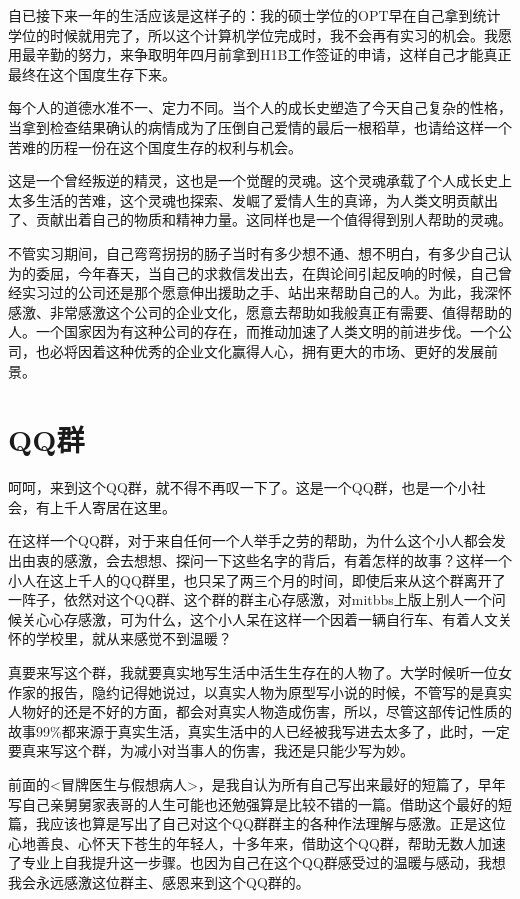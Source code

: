\documentclass[12pt]{book}
\begin{document}
自已接下来一年的生活应该是这样子的：我的硕士学位的OPT早在自己拿到统计学位的时候就用完了，所以这个计算机学位完成时，我不会再有实习的机会。我愿用最辛勤的努力，来争取明年四月前拿到H1B工作签证的申请，这样自己才能真正最终在这个国度生存下来。

每个人的道德水准不一、定力不同。当个人的成长史塑造了今天自己复杂的性格，当拿到检查结果确认的病情成为了压倒自己爱情的最后一根稻草，也请给这样一个苦难的历程一份在这个国度生存的权利与机会。

这是一个曾经叛逆的精灵，这也是一个觉醒的灵魂。这个灵魂承载了个人成长史上太多生活的苦难，这个灵魂也探索、发崛了爱情人生的真谛，为人类文明贡献出了、贡献出着自己的物质和精神力量。这同样也是一个值得得到别人帮助的灵魂。

不管实习期间，自己弯弯拐拐的肠子当时有多少想不通、想不明白，有多少自己认为的委屈，今年春天，当自己的求救信发出去，在舆论间引起反响的时候，自己曾经实习过的公司还是那个愿意伸出援助之手、站出来帮助自己的人。为此，我深怀感激、非常感激这个公司的企业文化，愿意去帮助如我般真正有需要、值得帮助的人。一个国家因为有这种公司的存在，而推动加速了人类文明的前进步伐。一个公司，也必将因着这种优秀的企业文化赢得人心，拥有更大的市场、更好的发展前景。

\chapter{QQ群}
\label{sec-48}

呵呵，来到这个QQ群，就不得不再叹一下了。这是一个QQ群，也是一个小社会，有上千人寄居在这里。

在这样一个QQ群，对于来自任何一个人举手之劳的帮助，为什么这个小人都会发出由衷的感激，会去想想、探问一下这些名字的背后，有着怎样的故事？这样一个小人在这上千人的QQ群里，也只呆了两三个月的时间，即使后来从这个群离开了一阵子，依然对这个QQ群、这个群的群主心存感激，对mitbbs上版上别人一个问候关心心存感激，可为什么，这个小人呆在这样一个因着一辆自行车、有着人文关怀的学校里，就从来感觉不到温暖？

真要来写这个群，我就要真实地写生活中活生生存在的人物了。大学时候听一位女作家的报告，隐约记得她说过，以真实人物为原型写小说的时候，不管写的是真实人物好的还是不好的方面，都会对真实人物造成伤害，所以，尽管这部传记性质的故事99\%都来源于真实生活，真实生活中的人已经被我写进去太多了，此时，一定要真来写这个群，为减小对当事人的伤害，我还是只能少写为妙。

前面的<冒牌医生与假想病人>，是我自认为所有自己写出来最好的短篇了，早年写自己亲舅舅家表哥的人生可能也还勉强算是比较不错的一篇。借助这个最好的短篇，我应该也算是写出了自己对这个QQ群群主的各种作法理解与感激。正是这位心地善良、心怀天下苍生的年轻人，十多年来，借助这个QQ群，帮助无数人加速了专业上自我提升这一步骤。也因为自己在这个QQ群感受过的温暖与感动，我想我会永远感激这位群主、感恩来到这个QQ群的。
\end{document}
